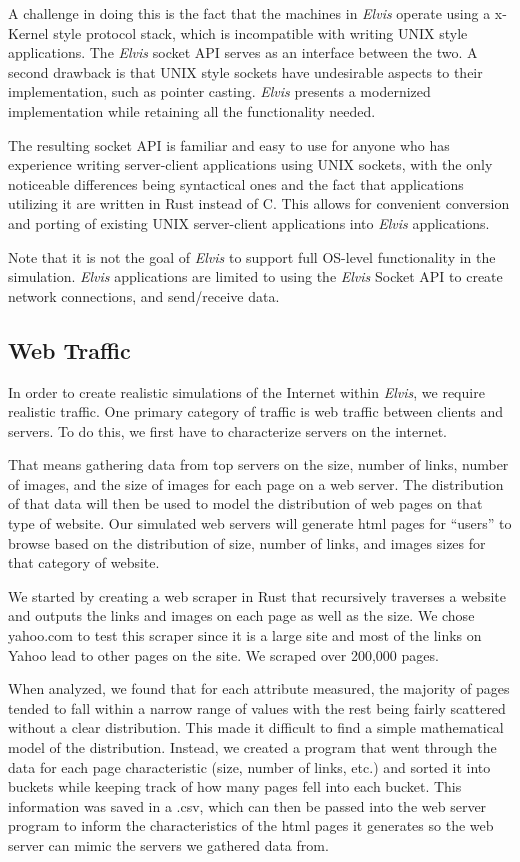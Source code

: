 \documentclass[journal]{IEEEtran} %
\newcommand{\elvis}{\textit{Elvis}}
\begin{document}
A challenge in doing this is the fact that the machines in \elvis{} operate using a x-Kernel style protocol stack, which is incompatible with writing UNIX style applications.
The \elvis{} socket API serves as an interface between the two.
A second drawback is that UNIX style sockets have undesirable aspects to their implementation, such as  pointer casting.
\elvis{} presents a modernized  implementation while retaining all the functionality needed.

The resulting socket API is familiar and easy to use for anyone who has experience writing server-client applications using UNIX sockets, with the only noticeable differences being syntactical ones and the fact that applications utilizing it are written in Rust instead of C. This allows for convenient conversion and porting of existing UNIX server-client applications into \elvis{} applications.

Note that it is not the goal of \elvis{} to support full OS-level functionality in the
simulation. \elvis{} applications are limited to using the \elvis{} Socket API to
create network connections, and send/receive data.

\subsection{Web Traffic}

In order to create realistic simulations of the Internet within \elvis{}, we require realistic traffic. One primary category of traffic is web traffic between clients and servers.  To do this, we first have to characterize servers on the internet.

That means gathering data from top servers on the size, number of links, number of images, and the size of images for each page on a web server. The distribution of that  data will then be used to model the distribution of web pages on that type of website. Our simulated web servers will generate html pages for “users” to browse based on the distribution of size, number of links, and images sizes for that category of website.

We started by creating a web scraper in Rust that recursively traverses a website and outputs the links and images on each page as well as the size. We chose yahoo.com to test this scraper since it is a large site and most of the links on Yahoo lead to other pages on the site. We scraped over 200,000 pages.

When analyzed, we found that for each attribute measured, the majority of pages tended to fall within a narrow range of values with the rest being fairly scattered without a clear distribution. This made it difficult to find a simple mathematical model of the distribution. Instead, we created a program that went through the data for each page characteristic (size, number of links, etc.) and sorted it into buckets while keeping track of how many pages fell into each bucket. This information was saved in a .csv, which can then be passed into the web server program to inform the characteristics of the html pages it generates so the web server can mimic the servers we gathered data from.
\end{document}
